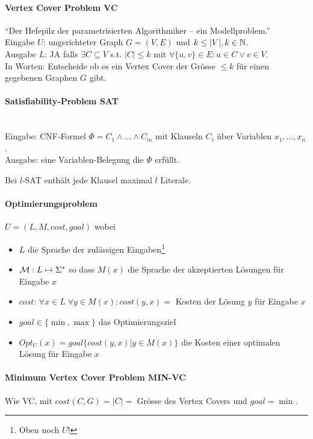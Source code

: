 \paragraph{Vertex Cover Problem VC}
``Der Hefepilz der parametrisierten Algorithmiker -- ein Modellproblem.''
\\
Eingabe $U$: ungerichteter Graph $G = (V, E)$ und $k \leq |V|, k \in \mathbb{N}$. \\
Ausgabe $L$: JA falls $\exists C \subseteq V$ s.t. $|C| \leq k$ mit $\forall \{u, v \} \in E: u \in C \vee v \in V$.\\
In Worten: Entscheide ob es ein Vertex Cover der Grösse $\leq k$ für einen gegebenen Graphen $G$ gibt.

\paragraph{Satisfiability-Problem SAT} \mbox{} \\
Eingabe: CNF-Formel $\Phi = C_1 \wedge \dots \wedge C_m$ mit Klauseln $C_i$ über Variablen $x_1, \dots, x_n$. \\
Ausgabe: eine Variablen-Belegung die $\Phi$ erfüllt.

Bei $l$-SAT enthält jede Klausel maximal $l$ Literale.

\paragraph{Optimierungsproblem}
$U = (L, M, cost, goal)$ wobei
\begin{itemize}
    \item $L$ die Sprache der zulässigen Eingaben\footnote{Oben noch $U$!}
    \item $\mathcal{M}: L \mapsto \Sigma^*$ so dass $M(x)$ die Sprache der akzeptierten Lösungen für Eingabe $x$
    \item $cost$: $\forall x \in L \; \forall y \in M(x) : cost(y, x) = $ Kosten der Lösung $y$ für Eingabe $x$
    \item $goal \in \{ \min, \max \}$ das Optimierungsziel
    \item $Opt_U(x) = goal \{ cost(y, x) | y \in M(x) \}$ die Kosten einer optimalen Lösung für Eingabe $x$
\end{itemize}

\paragraph{Minimum Vertex Cover Problem MIN-VC}
Wie VC, mit $cost(C, G) = |C| = $ Grösse des Vertex Covers und $goal = \min$.

